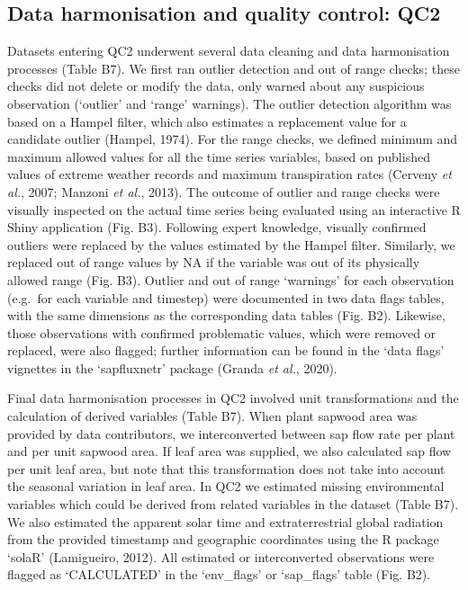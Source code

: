 \documentclass[11pt,twoside]{reedthesis}
\begin{document}
\subsection{Data harmonisation and quality control:
QC2}\label{data-harmonisation-and-quality-control-qc2}

Datasets entering QC2 underwent several data cleaning and data
harmonisation processes (Table B7). We first ran outlier detection and
out of range checks; these checks did not delete or modify the data,
only warned about any suspicious observation (`outlier' and `range'
warnings). The outlier detection algorithm was based on a Hampel filter,
which also estimates a replacement value for a candidate outlier
(Hampel, 1974). For the range checks, we defined minimum and maximum
allowed values for all the time series variables, based on published
values of extreme weather records and maximum transpiration rates
(Cerveny \emph{et al.}, 2007; Manzoni \emph{et al.}, 2013). The outcome
of outlier and range checks were visually inspected on the actual time
series being evaluated using an interactive R Shiny application (Fig.
B3). Following expert knowledge, visually confirmed outliers were
replaced by the values estimated by the Hampel filter. Similarly, we
replaced out of range values by NA if the variable was out of its
physically allowed range (Fig. B3). Outlier and out of range `warnings'
for each observation (e.g.~for each variable and timestep) were
documented in two data flags tables, with the same dimensions as the
corresponding data tables (Fig. B2). Likewise, those observations with
confirmed problematic values, which were removed or replaced, were also
flagged; further information can be found in the `data flags' vignettes
in the `sapfluxnetr' package (Granda \emph{et al.}, 2020).\par

Final data harmonisation processes in QC2 involved unit transformations
and the calculation of derived variables (Table B7). When plant sapwood
area was provided by data contributors, we interconverted between sap
flow rate per plant and per unit sapwood area. If leaf area was
supplied, we also calculated sap flow per unit leaf area, but note that
this transformation does not take into account the seasonal variation in
leaf area. In QC2 we estimated missing environmental variables which
could be derived from related variables in the dataset (Table B7). We
also estimated the apparent solar time and extraterrestrial global
radiation from the provided timestamp and geographic coordinates using
the R package `solaR' (Lamigueiro, 2012). All estimated or
interconverted observations were flagged as `CALCULATED' in the
`env\_flags' or `sap\_flags' table (Fig. B2).\par
\end{document}
